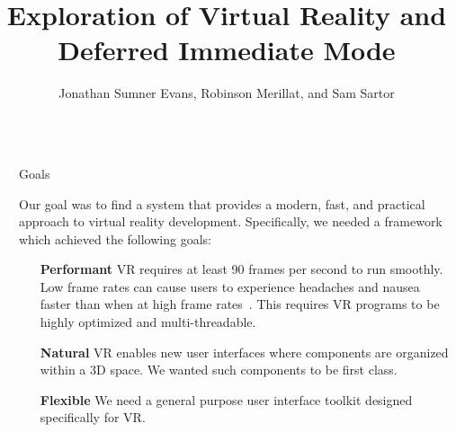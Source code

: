\documentclass[final]{beamer}
\title{Exploration of Virtual Reality and Deferred Immediate Mode}
\author{Jonathan Sumner Evans, Robinson Merillat, and Sam Sartor}
\institute{Department of Computer Science, Colorado School of Mines}
\newlength{\sepwid}
\newlength{\onecolwid}
\begin{document}

    \setlength{\belowcaptionskip}{2ex} %
    \setlength\belowdisplayshortskip{2ex} %

    \begin{frame}[t] %
        \begin{columns}[t]
            \begin{column}{\sepwid}\end{column} %

            \begin{column}{\onecolwid} %

                \begin{block}{Goals}

                    Our goal was to find a system that provides a modern, fast,
                    and practical approach to virtual reality development.
                    Specifically, we needed a framework which achieved the
                    following goals:

                    \begin{enumerate}[leftmargin=8.75cm, labelsep=1cm]

                        \item[\textbf{Performant}] VR requires at least 90
                            frames per second to run smoothly. Low frame rates
                            can cause users to experience headaches and nausea
                            faster than when at high frame rates~\cite{irisVR}.
                            This requires VR programs to be highly optimized and
                            multi-threadable.

                        \item[\textbf{Natural}] VR enables new user interfaces
                            where components are organized within a 3D space. We
                            wanted such components to be first class.

                        \item[\textbf{Flexible}] We need a general purpose user
                            interface toolkit designed specifically for VR.


\end{enumerate}
\end{block}
\end{column}
\end{columns}
\end{frame}
\end{document}
